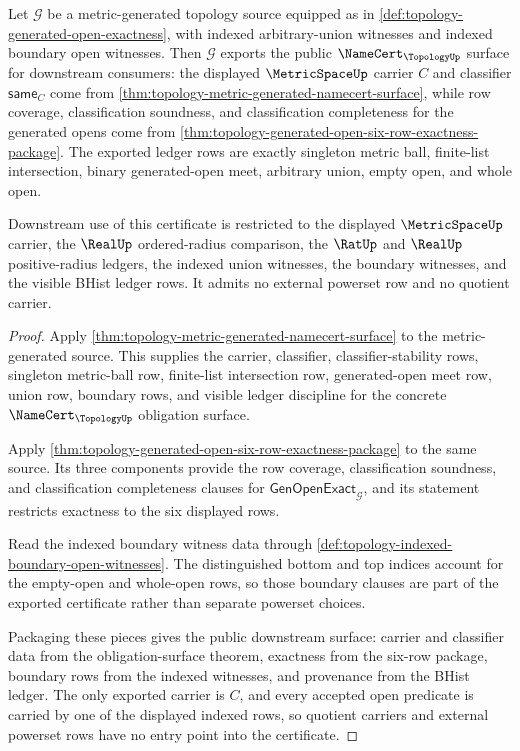 \begin{theorem}
\label{thm:topology-metric-generated-public-certificate}
Let $\mathcal{G}$ be a metric-generated topology source equipped as in \autoref{def:topology-generated-open-exactness}, with indexed arbitrary-union witnesses and indexed boundary open witnesses. Then $\mathcal{G}$ exports the public $\NameCert_{\TopologyUp}$ surface for downstream consumers: the displayed $\MetricSpaceUp$ carrier $C$ and classifier $\mathsf{same}_C$ come from \autoref{thm:topology-metric-generated-namecert-surface}, while row coverage, classification soundness, and classification completeness for the generated opens come from \autoref{thm:topology-generated-open-six-row-exactness-package}. The exported ledger rows are exactly singleton metric ball, finite-list intersection, binary generated-open meet, arbitrary union, empty open, and whole open.

Downstream use of this certificate is restricted to the displayed $\MetricSpaceUp$ carrier, the $\RealUp$ ordered-radius comparison, the $\RatUp$ and $\RealUp$ positive-radius ledgers, the indexed union witnesses, the boundary witnesses, and the visible BHist ledger rows. It admits no external powerset row and no quotient carrier.
\end{theorem}
\begin{proof}
Apply \autoref{thm:topology-metric-generated-namecert-surface} to the metric-generated source. This supplies the carrier, classifier, classifier-stability rows, singleton metric-ball row, finite-list intersection row, generated-open meet row, union row, boundary rows, and visible ledger discipline for the concrete $\NameCert_{\TopologyUp}$ obligation surface.

Apply \autoref{thm:topology-generated-open-six-row-exactness-package} to the same source. Its three components provide the row coverage, classification soundness, and classification completeness clauses for $\mathsf{GenOpenExact}_{\mathcal{G}}$, and its statement restricts exactness to the six displayed rows.

Read the indexed boundary witness data through \autoref{def:topology-indexed-boundary-open-witnesses}. The distinguished bottom and top indices account for the empty-open and whole-open rows, so those boundary clauses are part of the exported certificate rather than separate powerset choices.

Packaging these pieces gives the public downstream surface: carrier and classifier data from the obligation-surface theorem, exactness from the six-row package, boundary rows from the indexed witnesses, and provenance from the BHist ledger. The only exported carrier is $C$, and every accepted open predicate is carried by one of the displayed indexed rows, so quotient carriers and external powerset rows have no entry point into the certificate.
\end{proof}

